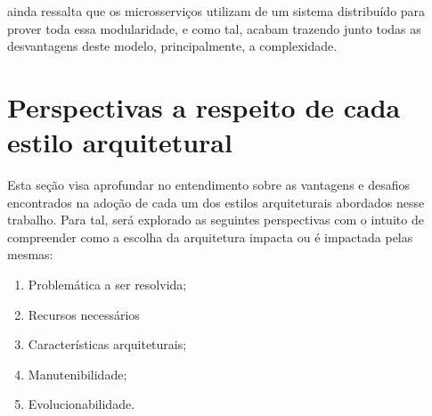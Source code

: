  ainda ressalta que os microsserviços utilizam de um sistema
distribuído para prover toda essa modularidade, e como tal, acabam trazendo junto todas as
desvantagens deste modelo, principalmente, a complexidade.

%
%

\section{Perspectivas a respeito de cada estilo arquitetural}

Esta seção visa aprofundar no entendimento sobre as vantagens e desafios encontrados na adoção
de cada um dos estilos arquiteturais abordados nesse trabalho. Para tal, será explorado as seguintes
perspectivas com o intuito de compreender como a escolha da arquitetura impacta ou é impactada pelas
mesmas:

\begin{enumerate}
    \item Problemática a ser resolvida;
    \item Recursos necessários
    \item Características arquiteturais;
    \item Manutenibilidade;
    \item Evolucionabilidade.
\end{enumerate}


